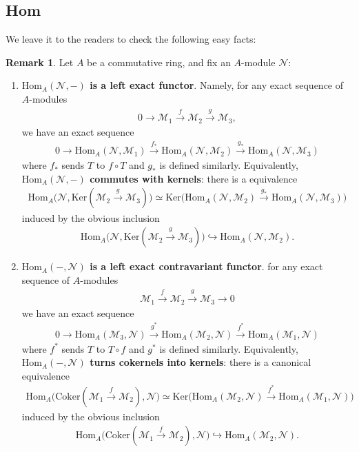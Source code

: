 \documentclass[12pt,b5paper,notitlepage]{report}
\theoremstyle{definition}
\newtheorem{rem}[df]{Remark}
\theoremstyle{plain}
\newcommand{\mc}{\mathcal}
\newcommand{\Hom}{\mathrm{Hom}}
\newcommand{\Ker}{\mathrm{Ker}}
\newcommand{\Cok}{\mathrm{Coker}}
\numberwithin{equation}{section}
\begin{document}
\subsection{Hom}

We leave it to the readers to check the following easy facts:
\begin{rem}\label{lb51}
Let $A$ be a commutative ring, and fix an $A$-module $\mc N$:
\begin{enumerate}[label=\arabic*.]
\item \textbf{$\Hom_A(\mc N,-)$ is a left exact functor}.  Namely, for any exact sequence of $A$-modules
\begin{align}
0\rightarrow\mc M_1\xrightarrow{f} \mc M_2\xrightarrow{g}\mc M_3,
\end{align}
we have an exact sequence 
\begin{align*}
0\rightarrow\Hom_A(\mc N,\mc M_1)\xrightarrow{f_*} \Hom_A(\mc N,\mc M_2)\xrightarrow{g_*}\Hom_A(\mc N,\mc M_3)
\end{align*}
where $f_*$ sends $T$ to $f\circ T$ and $g_*$ is defined similarly. Equivalently, \textbf{$\Hom_A(\mc N,-)$ commutes with kernels}: there is a equivalence
\begin{align}
\Hom_A\big(\mc N,\Ker(\mc M_2\xrightarrow{g}\mc M_3)\big)\simeq \Ker \big(\Hom_A(\mc N,\mc M_2)\xrightarrow{g_*}\Hom_A(\mc N,\mc M_3)\big)
\end{align}
induced by the obvious inclusion
\begin{align*}
\Hom_A\big(\mc N,\Ker(\mc M_2\xrightarrow{g}\mc M_3)\big)\hookrightarrow\Hom_A(\mc N,\mc M_2).
\end{align*}
\item \textbf{$\Hom_A(-,\mc N)$ is a left exact contravariant functor}.  for any exact sequence of $A$-modules
\begin{align}
\mc M_1\xrightarrow{f} \mc M_2\xrightarrow{g}\mc M_3\rightarrow 0
\end{align}
we have an exact sequence 
\begin{align*}
0\rightarrow\Hom_A(\mc M_3,\mc N)\xrightarrow{g^*} \Hom_A(\mc M_2,\mc N)\xrightarrow{f^*}\Hom_A(\mc M_1,\mc N)
\end{align*}
where $f^*$ sends $T$ to $T\circ f$ and $g^*$ is defined similarly. Equivalently, \textbf{$\Hom_A(-,\mc N)$ turns cokernels into kernels}: there is a canonical equivalence
\begin{align}
\Hom_A\big(\Cok(\mc M_1\xrightarrow{f}\mc M_2),\mc N\big)\simeq \Ker \big(\Hom_A(\mc M_2,\mc N)\xrightarrow{f^*}\Hom_A(\mc M_1,\mc N)\big)
\end{align}
induced by the obvious inclusion
\begin{align*}
\Hom_A\big(\Cok(\mc M_1\xrightarrow{f}\mc M_2),\mc N\big)\hookrightarrow\Hom_A(\mc M_2,\mc N).
\end{align*}
\end{enumerate}
\end{rem}
\end{document}
